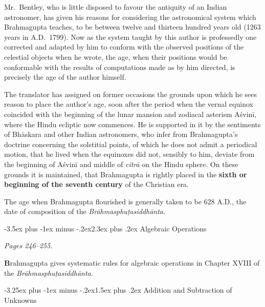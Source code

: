 \documentclass[11pt,a4paper]{article}
\makeatletter
\renewcommand{\section}{\@startsection {section}{1}{\z@}%
  {-3.5ex plus -1ex minus -.2ex}{2.3ex plus .2ex}%
  {\normalfont\Large\bfseries\color{sectioncolor}}}
\renewcommand{\subsection}{\@startsection{subsection}{2}{\z@}%
  {-3.25ex plus -1ex minus -.2ex}{1.5ex plus .2ex}%
  {\normalfont\large\bfseries\color{sectioncolor}}}
\newcommand{\cnote}[1]{\textcolor{notecolor}{\textit{#1}}}
\makeatother
\begin{document}
Mr.\ Bentley, who is little disposed to favour the antiquity of an Indian astronomer, has given his reasons for considering the astronomical system which Brahmagupta teaches, to be between twelve and thirteen hundred years old (1263 years in A.D.\ 1799). Now as the system taught by this author is professedly one corrected and adapted by him to conform with the observed positions of the celestial objects when he wrote, the age, when their positions would be conformable with the results of computations made as by him directed, is precisely the age of the author himself.

The translator has assigned on former occasions the grounds upon which he sees reason to place the author's age, soon after the period when the vernal equinox coincided with the beginning of the lunar mansion and zodiacal asterism Aśvinī, where the Hindu ecliptic now commences. He is supported in it by the sentiments of Bhāskara and other Indian astronomers, who infer from Brahmagupta's doctrine concerning the solstitial points, of which he does not admit a periodical motion, that he lived when the equinoxes did not, sensibly to him, deviate from the beginning of Aśvinī and middle of \textit{citrā} on the Hindu sphere. On these grounds it is maintained, that Brahmagupta is rightly placed in the \textbf{sixth or beginning of the seventh century} of the Christian era.

The age when Brahmagupta flourished is generally taken to be 628 A.D., the date of composition of the \textit{Brāhmasphuṭasiddhānta}.

\section{Algebraic Operations}
\label{sec:algebraic-ops}

\cnote{Pages 246--255.}

\textbf{B}rahmagupta gives systematic rules for algebraic operations in Chapter XVIII of the \textit{Brāhmasphuṭasiddhānta}.

\subsection{Addition and Subtraction of Unknowns}
\end{document}
